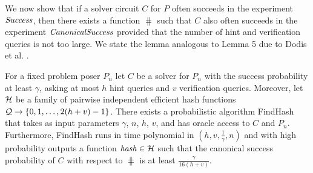 We now show that if a solver circuit $C$ for $P$ often succeeds in the experiment $\operatorname{\mathit{Success}}$,
then there exists a function $\hash$ such that $C$ also often succeeds in the experiment $\operatorname{\mathit{CanonicalSuccess}}$
provided that the number of hint and verification queries is not too large.
We state the lemma analogous to Lemma 5 due to Dodis et al. \cite{dodis2009security}.
%
\begin{lemma}
\label{lemma:hash_function_probability}
For a fixed problem poser $P_n$ let $C$ be a solver for $P_n$ with the success probability at least $\gamma$,
asking at most $h$ hint queries and $v$ verification queries.
Moreover, let $\mathcal{H}$ be a family of pairwise independent efficient hash functions $\mathcal{Q} \rightarrow \{0,1, \dots,2(h+v)-1\}$.
There exists a probabilistic algorithm FindHash that takes as input parameters $\gamma$, $n$, $h$, $v$, and has oracle access to $C$ and $P_n$.
Furthermore, FindHash runs in time polynomial in $(h,v,\frac{1}{\gamma},n)$ and with high probability outputs a function $\operatorname{\mathit{hash}} \in \mathcal{H}$
such that the canonical success probability of $C$ with respect to $\hash$ is at least $\frac{\gamma}{16(h+v)}$.
\end{lemma}
%
